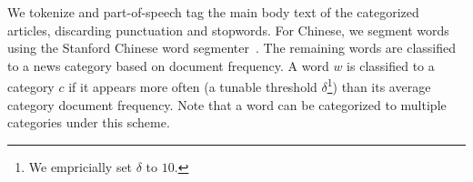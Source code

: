 \begin{CJK}{UTF8}{gbsn}

We tokenize and part-of-speech tag the main body text of the
categorized articles, discarding punctuation and stopwords.  For
Chinese, we segment words using the Stanford Chinese word
segmenter~\cite{Chang2008}. The remaining words are classified to a
news category based on document frequency. A word $w$ is classified to
a category $c$ if it appears more often (a tunable threshold
$\delta$\footnote{We empricially set $\delta$ to $10$.}) than its
average category document frequency.  Note that a word can be
categorized to multiple categories under this scheme.




\end{CJK}

